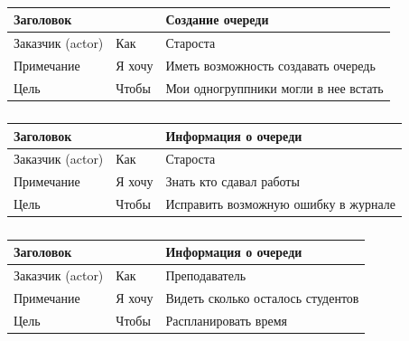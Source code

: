 \begin{table}[h!tp]
	\centering
	\caption{}
	\label{table:user_story:create}
	\begin{tabular}{|l|l|l|}
		\hline \multicolumn{2}{|l|}{Заголовок} & Создание очереди\\ \hline
		Заказчик (actor) & Как & Староста \\ \hline
		Примечание & Я хочу & Иметь возможность создавать очередь\\ \hline
		Цель & Чтобы & Мои одногруппники могли в нее встать\\ \hline
	\end{tabular}
\end{table}
\begin{table}[h!tp]
	\centering
	\caption{}
	\label{table:user_story:info:elder}
	\begin{tabular}{|l|l|l|}
		\hline \multicolumn{2}{|l|}{Заголовок} & Информация о очереди\\ \hline
		Заказчик (actor) & Как & Староста \\ \hline
		Примечание & Я хочу & Знать кто сдавал работы\\ \hline
		Цель & Чтобы & Исправить возможную ошибку в журнале\\ \hline
	\end{tabular}
\end{table}
\begin{table}[h!tp]
	\centering
	\caption{}
	\label{table:user_story:info:teacher}
	\begin{tabular}{|l|l|l|}
		\hline \multicolumn{2}{|l|}{Заголовок} & Информация о очереди\\ \hline
		Заказчик (actor) & Как & Преподаватель \\ \hline
		Примечание & Я хочу & Видеть сколько осталось студентов\\ \hline
		Цель & Чтобы & Распланировать время\\ \hline
	\end{tabular}
\end{table}

